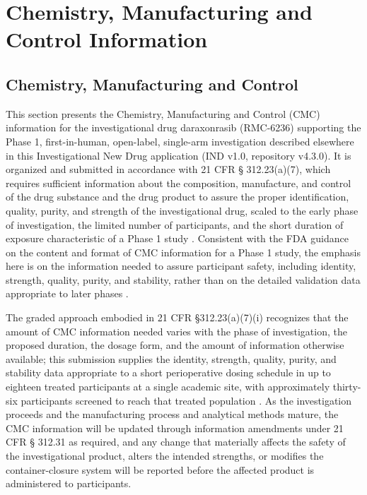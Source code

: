 \section{Chemistry, Manufacturing and Control Information}

\subsection{Chemistry, Manufacturing and Control}

This section presents the Chemistry, Manufacturing and Control (CMC)
information for the investigational drug daraxonrasib (RMC-6236) supporting the
Phase 1, first-in-human, open-label, single-arm investigation described
elsewhere in this Investigational New Drug application (IND v1.0, repository
v4.3.0). It is organized and submitted in accordance with 21 CFR \S
312.23(a)(7), which requires sufficient information about the composition,
manufacture, and control of the drug substance and the drug product to assure
the proper identification, quality, purity, and strength of the investigational
drug, scaled to the early phase of investigation, the limited number of
participants, and the short duration of exposure characteristic of a Phase 1
study \cite{phase1guidance}. Consistent with the FDA guidance on the content
and format of CMC information for a Phase 1 study, the emphasis here is on the
information needed to assure participant safety, including identity, strength,
quality, purity, and stability, rather than on the detailed validation data
appropriate to later phases \cite{phase1guidance}. 

The graded approach embodied
in 21 CFR \S 312.23(a)(7)(i) recognizes that the amount of CMC information
needed varies with the phase of investigation, the proposed duration, the dosage
form, and the amount of information otherwise available; this submission supplies
the identity, strength, quality, purity, and stability data appropriate to a
short perioperative dosing schedule in up to eighteen treated participants at a
single academic site, with approximately thirty-six participants screened to
reach that treated population \cite{phase1guidance}. As the investigation
proceeds and the manufacturing process and analytical methods mature, the CMC
information will be updated through information amendments under 21 CFR \S
312.31 as required, and any change that materially affects the safety of the
investigational product, alters the intended strengths, or modifies the
container-closure system will be reported before the affected product is
administered to participants.

